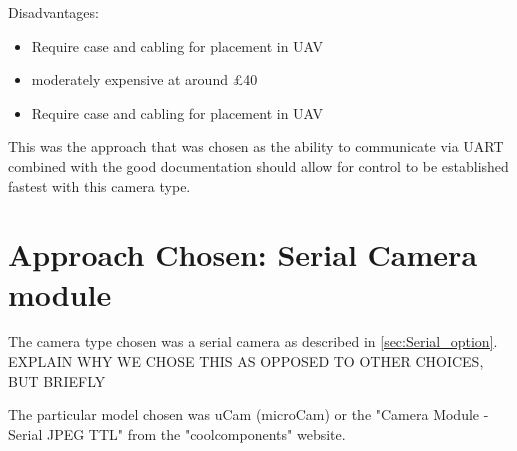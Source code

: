 Disadvantages:
     \begin{itemize}
        \item Require case and cabling for placement in UAV
	\item moderately expensive at around \pounds 40
        \item Require case and cabling for placement in UAV
     \end{itemize}

This was the approach that was chosen as the ability to communicate via UART combined with the good documentation should allow for control to be established fastest with this camera type.

\section{Approach Chosen: Serial Camera module}
\label{sec:John_chosen_options}

The camera type chosen was a serial camera as described in \ref{sec:Serial_option}. EXPLAIN WHY WE CHOSE THIS AS OPPOSED TO OTHER CHOICES, BUT BRIEFLY

The particular model chosen was uCam (microCam) or the "Camera Module - Serial JPEG TTL" from the "coolcomponents" website.

